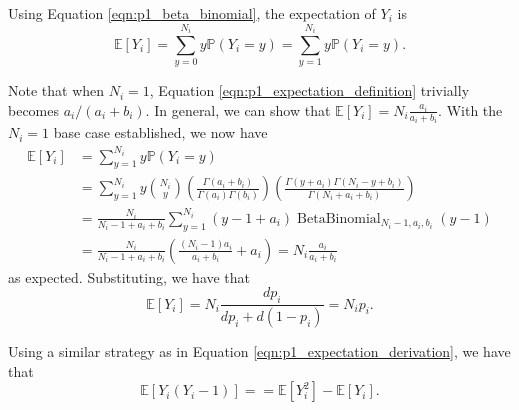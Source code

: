 \documentclass[letterpaper,11pt]{article}
\begin{document}
\begin{enumerate}
\begin{enumerate}
\begin{description}
      Using Equation \ref{eqn:p1_beta_binomial}, the expectation of $Y_i$ is
      \begin{equation}
        \mathbb{E}\left[Y_i\right]
        = \sum_{y=0}^{N_i}y\mathbb{P}\left(
        Y_i = y
          \right)
          = \sum_{y=1}^{N_i}y\mathbb{P}\left(
          Y_i = y
        \right).
        \label{eqn:p1_expectation_definition}
      \end{equation}

      Note that when $N_i = 1$, Equation \ref{eqn:p1_expectation_definition}
      trivially becomes $a_i/\left(a_i + b_i\right)$. In general, we can show
      that $\displaystyle\mathbb{E}\left[Y_i\right] = N_i\frac{a_i}{a_i +
        b_i}$. With the $N_i = 1$ base case established, we now have
        \begin{align}
          \mathbb{E}\left[Y_i\right]
        &= \sum_{y=1}^{N_i}y\mathbb{P}\left(Y_i = y\right) \nonumber\\
        &= \sum_{y=1}^{N_i} y {N_i \choose y}
          \left(
          \frac{\Gamma\left(a_i + b_i\right)}
          {\Gamma\left(a_i\right)\Gamma\left(b_i\right)}
          \right)
          \left(
          \frac{\Gamma\left(y + a_i\right)\Gamma\left(
          N_i - y + b_i
          \right)}
          {\Gamma\left(N_i + a_i + b_i\right)}
          \right) \nonumber\\
          &= \frac{N_i}{N_i - 1 + a_i + b_i} \sum_{y=1}^{N_i}
            \left(y - 1 + a_i\right)
            \operatorname{BetaBinomial}_{N_i - 1,a_i,b_i}
            \left(y - 1\right) \nonumber\\
        &= \frac{N_i}{N_i - 1 + a_i + b_i}
          \left(
          \frac{\left(N_i - 1\right)a_i}{a_i + b_i} + a_i
          \right) = N_i\frac{a_i}{a_i + b_i}
          \label{eqn:p1_expectation_derivation}
        \end{align}
      \normalsize
      as expected. Substituting, we have that
      \begin{equation}
        \mathbb{E}\left[
          Y_i \right]
        = N_i\frac{dp_i}{dp_i + d\left(1 - p_i\right)}  = N_ip_i.
        \label{eqn:p1_expectation_substitution}
      \end{equation}
      
      Using a similar strategy as in Equation
      \ref{eqn:p1_expectation_derivation}, we have that
      \begin{equation}
        \mathbb{E}\left[Y_i\left(Y_i - 1\right)\right]
        = 
        = \mathbb{E}\left[Y_i^2\right] - \mathbb{E}\left[Y_i\right].
      \end{equation}
          
    \end{description}
\end{enumerate}
\end{enumerate}
\end{document}
